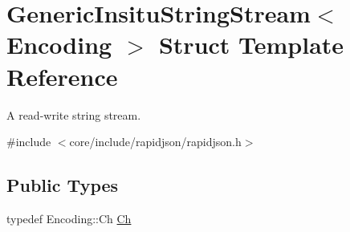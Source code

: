 \hypertarget{structGenericInsituStringStream}{}\section{Generic\+Insitu\+String\+Stream$<$ Encoding $>$ Struct Template Reference}
\label{structGenericInsituStringStream}


A read-\/write string stream.  




{\ttfamily \#include $<$core/include/rapidjson/rapidjson.\+h$>$}

\subsection*{Public Types}
\begin{DoxyCompactItemize}
\item 
typedef Encoding\+::\+Ch \hyperlink{structGenericInsituStringStream_a277308a58f551f11d0d9a20823702b5a}{Ch}
\end{DoxyCompactItemize}
